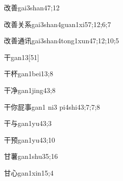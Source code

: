 
\begin{verbete}{改善}{gai3shan4}{7;12}
\end{verbete}

\begin{verbete}{改善关系}{gai3shan4guan1xi5}{7;12;6;7}
\end{verbete}

\begin{verbete}{改善通讯}{gai3shan4tong1xun4}{7;12;10;5}
\end{verbete}

\begin{verbete}{干}{gan1}{3}[51]
\end{verbete}

\begin{verbete}{干杯}{gan1bei1}{3;8}
\end{verbete}

\begin{verbete}{干净}{gan1jing4}{3;8}
\end{verbete}

\begin{verbete}{干你屁事}{gan1 ni3 pi4shi4}{3;7;7;8}
\end{verbete}

\begin{verbete}{干与}{gan1yu4}{3;3}
\end{verbete}

\begin{verbete}{干预}{gan1yu4}{3;10}
\end{verbete}

\begin{verbete}{甘薯}{gan1shu3}{5;16}
\end{verbete}

\begin{verbete}{甘心}{gan1xin1}{5;4}
\end{verbete}

